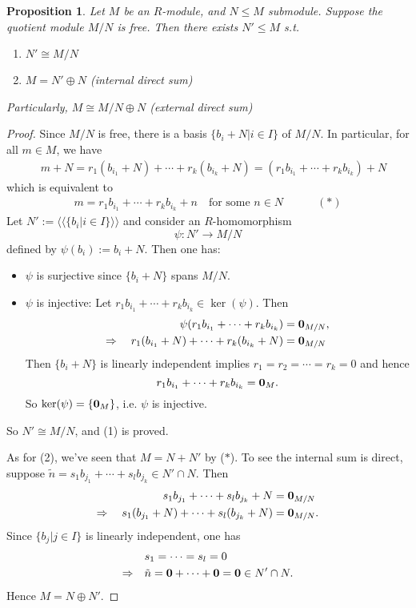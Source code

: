 \documentclass[12pt]{amsbook}
\newtheorem{proposition}[theorem]{Proposition}
\begin{document}
\begin{proposition}
    Let $M$ be an $R$-module, and $N\leq M$ submodule. Suppose the quotient module $M/N$ is free. Then there exists $N'\leq M$ s.t.
    \begin{enumerate}
        \item $N'\cong M/N$
        \item $M=N'\oplus N$ (internal direct sum)
    \end{enumerate}
    Particularly, $M\cong M/N\oplus N$ (external direct sum)
\end{proposition}
\begin{proof}
    Since $M/N$ is free, there is a basis $\{b_i+N|i\in I\}$ of $M/N$. In particular, for all $m\in M$, we have
    \begin{align*}
        \quad m+N = r_1(b_{i_1}+N)+\cdots+r_k(b_{i_k}+N) =(r_1b_{i_1}+\cdots+r_kb_{i_k})+N\end{align*}
    which is equivalent to 
     \begin{align*}
     m = r_1b_{i_1}+\cdots+r_kb_{i_k}+n \quad\text{for some $n\in N$} \quad \quad \quad (\ast)
    \end{align*}
    Let $N':=\langle\langle\{b_i|i\in I\}\rangle\rangle$ and consider an $R$-homomorphism
    $$\psi: N'\rightarrow M/N$$
    defined by $\psi(b_i) := b_i+N$. Then one has:
    \begin{itemize}
        \item $\psi$ is surjective since $\{b_i+N\}$ spans $M/N$.
        \item $\psi$ is injective: Let $r_1b_{i_1}+\cdots+r_kb_{i_k} \in \ker(\psi)$. Then
        \begin{align*}
        \psi(r_1b_{i_1}+\cdots+r_kb_{i_k}) &= {\bf 0}_{M/N},\\
        \Rightarrow \quad r_1(b_{i_1}+N)+\cdots+r_k(b_{i_k}+N) &= {\bf 0}_{M/N}
        \end{align*}
        Then $\{b_i+N\}$ is linearly independent implies $r_1=r_2=\cdots=r_k= 0$
and hence 
$$r_1b_{i_1}+\cdots+r_kb_{i_k} = {\bf 0}_M.$$
        So $\mathrm{ker}(\psi) = \{{\bf 0}_M\}$, i.e. $\psi$ is injective.
    \end{itemize}
So $N' \cong M/N$, and (1) is proved.

\medskip
    As for (2), we've seen that $M=N+N'$ by ($\ast$). To see the internal sum is direct, suppose $\tilde{n}= s_1b_{j_1}+\cdots+s_lb_{j_k}\in N'\cap N$. Then
    \begin{align*}
        \quad s_1b_{j_1}+\cdots+s_lb_{j_k}+N&={\bf 0}_{M/N}\\
        \Rightarrow \quad s_1(b_{j_1}+N)+\cdots+s_l(b_{j_{k}}+N) &= {\bf 0}_{M/N}.
    \end{align*}
    Since $\{b_j|j\in I\}$ is linearly independent, one has
    \begin{align*}
        &\quad s_1=\cdots= s_l=0\\
        \Rightarrow &\quad \tilde{n}={\bf 0}+\cdots+{\bf 0}={\bf 0}\in N'\cap N.
    \end{align*}
    Hence $M=N\oplus N'$.        
\end{proof}
\end{document}
